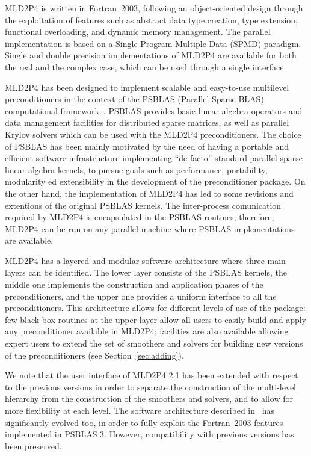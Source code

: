 MLD2P4 is written in Fortran~2003, following an
object-oriented design through the exploitation of features
such as abstract data type creation, type extension, functional overloading, and
dynamic memory management. %
The parallel implementation is based on a Single Program Multiple Data
(SPMD) paradigm.  Single and
double precision implementations of MLD2P4 are available for both the
real and the complex case, which can be used through a single
interface. 

MLD2P4 has been designed to implement scalable and easy-to-use
multilevel preconditioners in the context of the PSBLAS (Parallel Sparse BLAS)
computational framework~\cite{psblas_00,PSBLAS3}. PSBLAS provides basic linear algebra
operators and data management facilities for distributed sparse matrices,
as well as parallel Krylov solvers which can be used with the MLD2P4 preconditioners.
The choice of PSBLAS has been mainly motivated by the need of having
a portable and efficient software infrastructure implementing ``de facto'' standard
parallel sparse linear algebra kernels, to pursue goals such as performance,
portability, modularity ed extensibility in the development of the preconditioner
package. On the other hand, the implementation of MLD2P4 has led to some
revisions and extentions of the original PSBLAS kernels.
The inter-process comunication required by MLD2P4 is encapsulated
in the PSBLAS routines;
therefore, MLD2P4 can be run on any parallel machine where PSBLAS 
implementations are available.

MLD2P4 has a layered and modular software architecture where three main layers can be
identified.  The lower layer consists of the PSBLAS kernels, the middle one implements
the construction and application phases of the preconditioners, and the upper one
provides a uniform interface to all the preconditioners. 
This architecture allows for different levels of use of the package:
few black-box routines at the upper layer allow all users to easily
build and apply any preconditioner available in MLD2P4;
facilities are also available allowing  expert users to extend the set of smoothers
and solvers for building new versions of the preconditioners (see
Section~\ref{sec:adding}). 

We note that the user interface of MLD2P4 2.1 has been extended with respect to the
previous versions in order to separate the construction of the multi-level hierarchy from
the construction of the smoothers and solvers, and to allow for more flexibility
at each level. The software architecture described in~\cite{MLD2P4_TOMS} has significantly
evolved too, in order to fully exploit the Fortran~2003 features implemented in PSBLAS 3.
However, compatibility with previous versions has been preserved.

